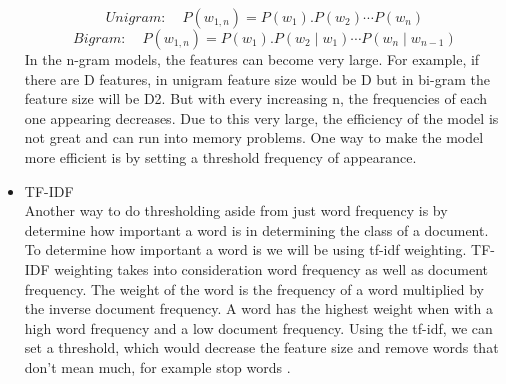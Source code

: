 \documentclass[a4paper, 11pt]{article}
\begin{document}
\begin{itemize}
	\begin{equation}
		\textit{Unigram:}  \hspace{15pt} P(w_{1,n})  = P(w_1).P(w_2) \cdots P(w_n)
	\end{equation}
	\begin{equation}
	\textit{Bigram:}  \hspace{15pt} P(w_{1,n})  = P(w_1).P(w_2 \mid  w_1) \cdots P(w_n \mid w_{n-1})
	\end{equation}
	In the n-gram models, the features can become very large. For example, if there are D features, in unigram feature size would be D but in bi-gram the feature size will be D2. But with every increasing n, the frequencies of each one appearing decreases. Due to this very large, the efficiency of the model is not great and can run into memory problems. One way to make the model more efficient is by setting a threshold frequency of appearance\cite{furnkranz1998study}.  \\
	
	\item TF-IDF\\
	Another way to do thresholding aside from just word frequency is by determine how important a word is in determining the class of a document. To determine how important a word is we will be using tf-idf weighting. TF-IDF weighting takes into consideration word frequency as well as document frequency. The weight of the word is the frequency of a word multiplied by the inverse document frequency. A word has the highest weight when with a high word frequency and a low document frequency. Using the tf-idf, we can set a threshold, which would decrease the feature size and remove words that don’t mean much, for example stop words \cite{schutze2008introduction}.
	
\end{itemize}
\end{document}
